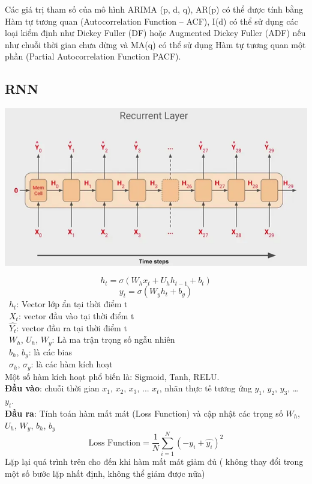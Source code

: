 Các giá trị tham số của mô hình ARIMA (p, d, q), AR(p) có thể được tính bằng Hàm tự tương quan (Autocorrelation Function – ACF), I(d) có thể sử dụng các loại kiểm định như Dickey Fuller (DF) hoặc Augmented Dickey Fuller (ADF) nếu như chuỗi thời gian chưa dừng và MA(q) có thể sử dụng Hàm tự tương quan một phần (Partial Autocorrelation Function PACF).

\subsection{RNN}
\begin{minipage}{0.45\textwidth}
\centering
\includegraphics[width=1\textwidth]{resources/chapter-4/rnn-1.png}
\end{minipage}
\[h_t = \sigma (W_{h}x_{t} + U_h h_{t-1} + b_t) \]
\[y_t = \sigma (W_{y} h_t + b_y)\]
    \indent\textbullet\ \(h_t\): Vector lớp ẩn tại thời điểm t\\
    \indent\textbullet\ \(X_t\): vector đầu vào tại thời điểm t\\
    \indent\textbullet\ \(\widehat{Y_t}\): vector đầu ra tại thời điểm t\\
    \indent\textbullet\ \(W_h\), \(U_h\), \(W_y\): Là ma trận trọng số ngẫu nhiên\\
    \indent\textbullet\ \(b_h\), \(b_y\): là các bias\\
    \indent\textbullet\ \(\sigma_h\), \(\sigma_y\): là các hàm kích hoạt\\
Một số hàm kích hoạt phổ biến là: Sigmoid, Tanh, RELU.\\
\textbf{Đầu vào}: chuỗi thời gian \(x_1\), \(x_2\), \(x_3\), ... \(x_t\), nhãn thực tế tương ứng \(y_1\), \(y_2\), \(y_3\), … \(y_t\).\\
\textbf{Đầu ra}: Tính toán hàm mất mát (Loss Function) và cập nhật các trọng số \(W_h\), \(U_h\), \(W_y\), \(b_h\), \(b_y\)
\[\text{Loss Function} = \frac{1}{N} \sum_{i=1}^{N} (-y_i + \hat{y_i})^2\]
Lặp lại quá trình trên cho đến khi hàm mất mát giảm đủ ( không thay đổi trong một số bước lặp nhất định, không thể giảm được nữa)
